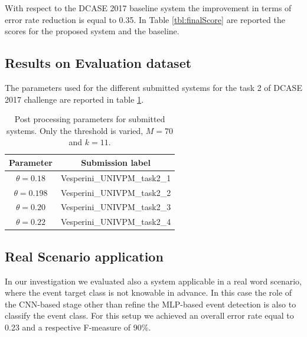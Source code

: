 \documentclass{article}
\begin{document}
\begin{sloppy}
With respect to the DCASE 2017 baseline system the improvement in terms of error rate reduction is equal to 0.35. In Table \ref{tbl:finalScore} are reported the scores for the proposed system and the baseline.

\subsection{Results on Evaluation dataset}
The parameters used for the different submitted systems for the task 2 of DCASE 2017 challenge are reported in table \ref{tbl:submitted-params}.

\begin{table}[t]
	\caption{Post processing parameters for submitted systems. Only the threshold is varied, $M = 70$ and $k=11$.}
	\label{tbl:submitted-params}
	\centering
	\footnotesize
	\begin{tabular} {| c | c |}
		\hline
		Parameter     & Submission label\\  
		\hline
		\hline                                     
		$\theta=0.18$ & Vesperini\_UNIVPM\_task2\_1 \\
		\hline                                     
		$\theta=0.198$ & Vesperini\_UNIVPM\_task2\_2 \\
		\hline
		$\theta=0.20$ & Vesperini\_UNIVPM\_task2\_3 \\
		\hline   
		$\theta=0.22$ & Vesperini\_UNIVPM\_task2\_4 \\
		\hline                                       
	\end{tabular}
\end{table}


\subsection{Real Scenario application}
In our investigation we evaluated also a system applicable in a real word scenario, where the event target class is not knowable in advance. In this case the role of the CNN-based stage other than refine the MLP-based event detection is also to classify the event class. For this setup we achieved an overall error rate equal to 0.23 and a respective F-measure of 90\%.


\end{sloppy}
\end{document}
